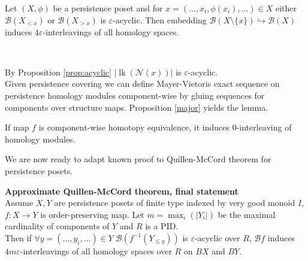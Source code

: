 \begin{lemma}
  Let $(X,\phi)$ be a persistence poset and for $x=(\ldots,x_i,\phi(x_i),\ldots) \in X$ either $\mathcal{B}(X_{< x})$ or $\mathcal{B}(X_{> x})$ is $\varepsilon$-acyclic. Then embedding $\mathcal{B}(X \setminus \{x\}) \hookrightarrow \mathcal{B}(X)$ induces $4\varepsilon$-interleavings of all homology spaces.
\end{lemma}

\begin{pf} ~ \par
  By Proposition \ref{prop:acyclic} $\left|\operatorname{lk}(\mathcal{N}(x))\right|$ is $\varepsilon$-acyclic.\\

  Given persistence covering we can define Mayer-Vietoris exact sequence on persistence homology modules component-wise by gluing sequences for components over structure maps. Proposition \ref{major} yields the lemma.
\end{pf}

\begin{remark}
  If map $f$ is component-wise homotopy equivalence, it induces $0$-interleaving of homology modules.
\end{remark}

We are now ready to adapt known proof to Quillen-McCord theorem for persistence posets.

\begin{theorem} \textbf{Approximate Quillen-McCord theorem, final statement}\\
  Assume $X, Y$ are persistence posets of finite type indexed by very good monoid $I$, $f : X \to Y$ is order-preserving map. Let $m = \max_{i}(|Y_i|)$ be the maximal cardinality of components of $Y$ and $R$ is a PID.\\

  Then if $\forall y=(\ldots,y_i,\ldots) \in Y\;\mathcal{B}(f^{-1}(Y_{\leqslant y}))$ is $\varepsilon$-acyclic over $R$, $\mathcal{B}f$ induces $4m\varepsilon$-interleavings of all homology spaces over $R$ on $BX$ and $BY$.\\
\end{theorem}

